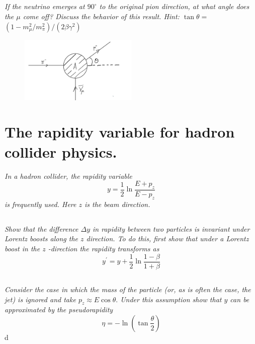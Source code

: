\documentclass{article}
\begin{document}
\subsection{} 
\textit{If the neutrino emerges at $90^{\circ}$ to the original pion direction, at what angle does the $\mu$ come off? Discuss the behavior of this result. Hint: $\tan \theta=$ $\left(1-m_{\mu}^{2} / m_{\pi}^{2}\right) /\left(2 \beta \gamma^{2}\right)$}


\begin{figure}[h!]
    \centering
    \includegraphics[width=0.5\textwidth]{figures/problem_9.png}
    \label{fig:my_label}
\end{figure}



\newpage


\section{The rapidity variable for hadron collider physics.}
\textit{In a hadron collider, the rapidity variable
$$
y=\frac{1}{2} \ln \frac{E+p_{z}}{E-p_{z}}
$$
is frequently used. Here $z$ is the beam direction.}


\subsection{}
\textit{Show that the difference $\Delta y$ in rapidity between two particles is invariant under Lorentz boosts along the $z$ direction. To do this, first show that under a Lorentz boost in the $z$ -direction the rapidity transforms as
$$
y^{\prime}=y+\frac{1}{2} \ln \frac{1-\beta}{1+\beta}
$$}


\subsection{}
\textit{Consider the case in which the mass of the particle (or, as is often the case, the jet) is ignored and take $p_{z} \approx E \cos \theta .$ Under this assumption show that $y$ can be approximated by the pseudorapidity
$$
\eta=-\ln \left(\tan \frac{\theta}{2}\right)
$$}d
\end{document}
